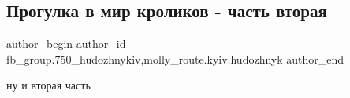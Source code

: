  
 
 
 
 

\subsection{Прогулка в мир кроликов - часть вторая}
\label{sec:25_04_2018.fb.fb_group.750_hudozhnykiv.1.progulka_v_mir_krolikov_two}
 
\ifcmt
 author_begin
   author_id fb_group.750_hudozhnykiv,molly_route.kyiv.hudozhnyk
 author_end
\fi

ну и вторая часть
